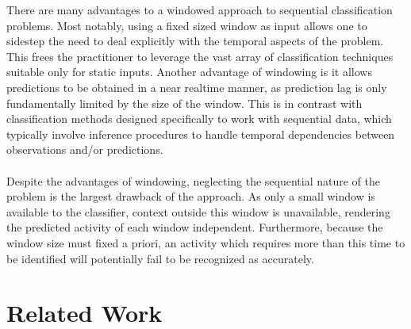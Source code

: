 \documentclass[12pt]{report}
\newcommand{\1}[0]{\mathbbm{1}}
\begin{document}
There are many advantages to a windowed approach to sequential classification problems.
Most notably, using a fixed sized window as input allows one to sidestep the need to deal
explicitly with the temporal aspects of the problem. This frees the practitioner
to leverage the vast array of classification techniques suitable only for static
inputs. Another advantage of windowing is it allows predictions to be obtained in
a near realtime manner, as prediction lag is only fundamentally limited by the size
of the window. This is in contrast with classification methods designed specifically
to work with sequential data, which typically involve inference procedures
to handle temporal dependencies between observations and/or predictions.
\\\\
Despite the advantages of windowing, neglecting the sequential nature of the problem
is the largest drawback of the approach. As only a small window is available
to the classifier, context outside this window is unavailable, rendering
the predicted activity of each window independent. Furthermore, because the
window size must fixed a priori, an activity which requires more than this time
to be identified will potentially fail to be recognized as accurately.

\section{Related Work}
\label{sec:HAR Related Work}
\end{document}
